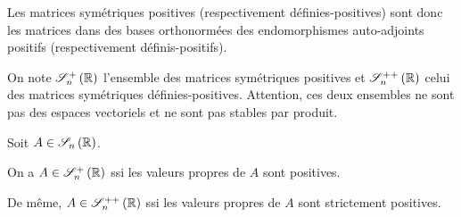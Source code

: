 Les matrices symétriques positives (respectivement définies-positives) sont donc les matrices dans des bases orthonormées des endomorphismes auto-adjoints positifs (respectivement définis-positifs).

On note \(\sympos{n}[\R]\) l'ensemble des matrices symétriques positives et \(\symdefpos{n}[\R]\) celui des matrices symétriques définies-positives. Attention, ces deux ensembles ne sont pas des espaces vectoriels et ne sont pas stables par produit.

\begin{prop}
Soit \(A\in\sym{n}[\R]\).

On a \(A\in\sympos{n}[\R]\) ssi les valeurs propres de \(A\) sont positives.

De même, \(A\in\symdefpos{n}[\R]\) ssi les valeurs propres de \(A\) sont strictement positives.
\end{prop}
